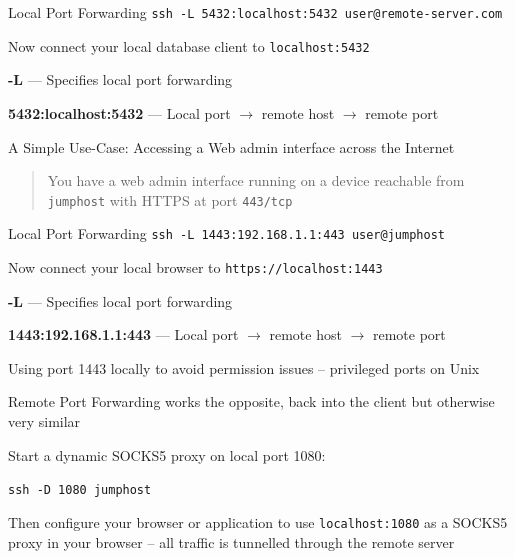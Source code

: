 \documentclass[Screen16to9,17pt]{foils}
\begin{document}
Local Port Forwarding
\verb+ssh -L 5432:localhost:5432 user@remote-server.com+

Now connect your local database client to \verb+localhost:5432+

\begin{list2}
\item {\bf -L} --- Specifies local port forwarding
\item {\bf 5432:localhost:5432} --- Local port $\rightarrow$ remote host $\rightarrow$ remote port
\end{list2}




A Simple Use-Case: Accessing a Web admin interface across the Internet

\begin{quote}
You have a web admin interface running on a device reachable from \verb+jumphost+ with HTTPS at port \verb+443/tcp+
\end{quote}

Local Port Forwarding
\verb+ssh -L 1443:192.168.1.1:443 user@jumphost+

Now connect your local browser to \verb+https://localhost:1443+

\begin{list2}
\item {\bf -L} --- Specifies local port forwarding
\item {\bf 1443:192.168.1.1:443} --- Local port $\rightarrow$ remote host $\rightarrow$ remote port
\item Using port 1443 locally to avoid permission issues -- privileged ports on Unix
\item Remote Port Forwarding works the opposite, back into the client but otherwise very similar
\end{list2}




Start a dynamic SOCKS5 proxy on local port 1080:

\verb+ssh -D 1080 jumphost+

Then configure your browser or application to use \verb+localhost:1080+ as a SOCKS5 proxy in your browser --
all traffic is tunnelled through the remote server
\end{document}
